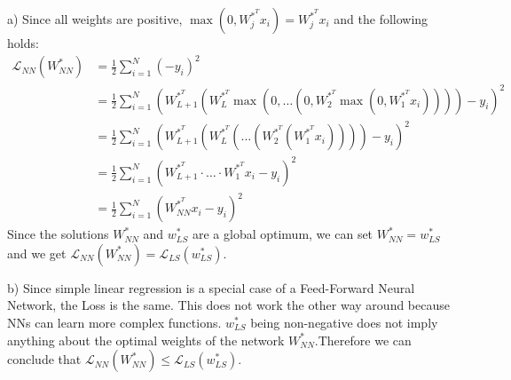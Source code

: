 

\newcommand{\ExerciseNumber}{10}

\newcommand{\PersonOne}{Marcel Bruckner (03674122)}
\newcommand{\PersonTwo}{Julian Hohenadel (03673879)}
\newcommand{\PersonThree}{Kevin Bein (03707775)}






%
%
%
\begin{flushleft}
a) Since all weights are positive, $\max(0, W_j^{*^T} x_i) = W_j^{*^T}x_i$ and the following holds:
\begin{align*}
	\mathcal{L}_{NN}(W^*_{NN}) &= \frac{1}{2} \sum_{i=1}^N ( - y_i)^2 \\
	&= \frac{1}{2} \sum_{i=1}^N (  W_{L+1}^{*^T} (W_L^{*^T} \max(0, \ldots(0, W_2^{*^T}\max(0, W_1^{*^T} x_i)))) - y_i)^2 \\
	&= \frac{1}{2} \sum_{i=1}^N (  W_{L+1}^{*^T} (W_L^{*^T}(\ldots ( W_2^{*^T}( W_1^{*^T} x_i)))) - y_i)^2 \\
	&= \frac{1}{2} \sum_{i=1}^N (  W_{L+1}^{*^T} \cdot \ldots \cdot  W_1^{*^T} x_i - y_i)^2 \\
	&= \frac{1}{2} \sum_{i=1}^N (  W_{NN}^{*^T} x_i - y_i)^2 
\end{align*}
Since the solutions $W^*_{NN}$ and $w^*_{LS}$ are a global optimum, we can set $W_{NN}^* = w_{LS}^*$ and we get $\mathcal{L}_{NN}(W^*_{NN}) = \mathcal{L}_{LS}(w^*_{LS})$.
\end{flushleft}

\begin{flushleft}
b) Since simple linear regression is a special case of a Feed-Forward Neural Network, the Loss is the same. This does not work the other way around because NNs can learn more complex functions. $w^*_{LS}$ being non-negative does not imply anything about the optimal weights of the network $W^*_{NN}$.Therefore we can conclude that  $\mathcal{L}_{NN}(W^*_{NN}) \leq \mathcal{L}_{LS}(w^*_{LS})$.
\end{flushleft}
%
%
%

%
%

